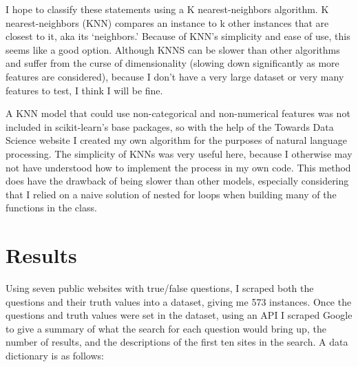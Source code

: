 \documentclass[]{article}
\begin{document}
		I hope to classify these statements using a K nearest-neighbors algorithm. K nearest-neighbors (KNN) compares an instance to k other instances that are closest to it, aka its `neighbors.' Because of KNN's simplicity and ease of use, this seems like a good option. Although KNNS can be slower than other algorithms and suffer from the curse of dimensionality (slowing down significantly as more features are considered), because I don't have a very large dataset or very many features to test, I think I will be fine.
		
		A KNN model that could use non-categorical and non-numerical features was not included in scikit-learn's base packages, so with the help of the Towards Data Science website \cite{tds} I created my own algorithm for the purposes of natural language processing. The simplicity of KNNs was very useful here, because I otherwise may not have understood how to implement the process in my own code. This method does have the drawback of being slower than other models, especially considering that I relied on a naive solution of nested for loops when building  many of the functions in the class.
		
		
		
		
	\section{Results}
	
	
	
		
		Using seven public websites with true/false questions, I scraped both the questions and their truth values into a dataset, giving me 573 instances. Once the questions and truth values were set in the dataset, using an API I scraped Google to give a summary of what the search for each question would bring up, the number of results, and the descriptions of the first ten sites in the search. A data dictionary is as follows:
		
\end{document}
